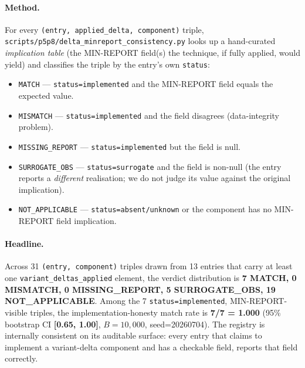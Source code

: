 \paragraph{Method.} For every
\texttt{(entry, applied\_delta, component)} triple,
\texttt{scripts/p5p8/delta\_minreport\_consistency.py} looks up a
hand-curated \emph{implication table} (the MIN-REPORT field(s) the
technique, if fully applied, would yield) and classifies the triple
by the entry's own \texttt{status}:

\begin{itemize}
\item \texttt{MATCH} --- \texttt{status=implemented} and the
MIN-REPORT field equals the expected value.
\item \texttt{MISMATCH} --- \texttt{status=implemented} and the
field disagrees (data-integrity problem).
\item \texttt{MISSING\_REPORT} --- \texttt{status=implemented} but
the field is null.
\item \texttt{SURROGATE\_OBS} --- \texttt{status=surrogate} and the
field is non-null (the entry reports a \emph{different}
realisation; we do not judge its value against the original
implication).
\item \texttt{NOT\_APPLICABLE} --- \texttt{status=absent/unknown} or
the component has no MIN-REPORT field implication.
\end{itemize}

\paragraph{Headline.} Across 31 \texttt{(entry, component)} triples
drawn from 13 entries that carry at least one
\texttt{variant\_deltas\_applied} element, the verdict distribution
is \textbf{7 MATCH, 0 MISMATCH, 0 MISSING\_REPORT, 5
SURROGATE\_OBS, 19 NOT\_APPLICABLE}. Among the 7
\texttt{status=implemented}, MIN-REPORT-visible triples, the
implementation-honesty match rate is \textbf{7/7 = 1.000} (95\%
bootstrap CI \textbf{[0.65, 1.00]}, $B=10{,}000$, seed=20260704).
The registry is internally consistent on its auditable surface:
every entry that claims to implement a variant-delta component and
has a checkable field, reports that field correctly.

